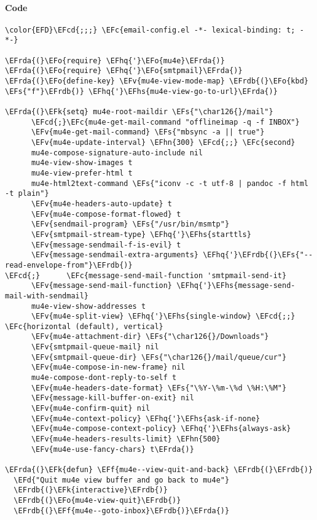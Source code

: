 \documentclass[a4wide,10pt]{article}
\newcommand{\EFc}[1]{\textcolor{EFc}{#1}} %
\newcommand{\EFcd}[1]{\textcolor{EFcd}{#1}} %
\newcommand{\EFs}[1]{\textcolor{EFs}{#1}} %
\newcommand{\EFd}[1]{\textcolor{EFd}{#1}} %
\newcommand{\EFk}[1]{\textcolor{EFk}{#1}} %
\newcommand{\EFf}[1]{\textcolor{EFf}{#1}} %
\newcommand{\EFv}[1]{\textcolor{EFv}{#1}} %
\newcommand{\EFo}[1]{\textcolor{EFo}{#1}} %
\newcommand{\EFhn}[1]{\textcolor{EFhn}{\textbf{#1}}} %
\newcommand{\EFhq}[1]{\textcolor{EFhq}{#1}} %
\newcommand{\EFhs}[1]{\textcolor{EFhs}{#1}} %
\newcommand{\EFrda}[1]{\textcolor{EFrda}{#1}} %
\newcommand{\EFrdb}[1]{\textcolor{EFrdb}{#1}} %
\begin{document}
\paragraph{Code}
\label{sec:orgbec5933}
\begin{Code}
\begin{Verbatim}
\color{EFD}\EFcd{;;;} \EFc{email-config.el -*- lexical-binding: t; -*-}

\EFrda{(}\EFo{require} \EFhq{'}\EFo{mu4e}\EFrda{)}
\EFrda{(}\EFo{require} \EFhq{'}\EFo{smtpmail}\EFrda{)}
\EFrda{(}\EFo{define-key} \EFv{mu4e-view-mode-map} \EFrdb{(}\EFo{kbd} \EFs{"f"}\EFrdb{)} \EFhq{'}\EFhs{mu4e-view-go-to-url}\EFrda{)}

\EFrda{(}\EFk{setq} mu4e-root-maildir \EFs{"\char126{}/mail"}
      \EFcd{;}\EFc{mu4e-get-mail-command "offlineimap -q -f INBOX"}
      \EFv{mu4e-get-mail-command} \EFs{"mbsync -a || true"}
      \EFv{mu4e-update-interval} \EFhn{300} \EFcd{;;} \EFc{second}
      mu4e-compose-signature-auto-include nil
      mu4e-view-show-images t
      mu4e-view-prefer-html t
      mu4e-html2text-command \EFs{"iconv -c -t utf-8 | pandoc -f html -t plain"}
      \EFv{mu4e-headers-auto-update} t
      \EFv{mu4e-compose-format-flowed} t
      \EFv{sendmail-program} \EFs{"/usr/bin/msmtp"}
      \EFv{smtpmail-stream-type} \EFhq{'}\EFhs{starttls}
      \EFv{message-sendmail-f-is-evil} t
      \EFv{message-sendmail-extra-arguments} \EFhq{'}\EFrdb{(}\EFs{"--read-envelope-from"}\EFrdb{)}
\EFcd{;}      \EFc{message-send-mail-function 'smtpmail-send-it}
      \EFv{message-send-mail-function} \EFhq{'}\EFhs{message-send-mail-with-sendmail}
      mu4e-view-show-addresses t
      \EFv{mu4e-split-view} \EFhq{'}\EFhs{single-window} \EFcd{;;} \EFc{horizontal (default), vertical}
      \EFv{mu4e-attachment-dir} \EFs{"\char126{}/Downloads"}
      \EFv{smtpmail-queue-mail} nil
      \EFv{smtpmail-queue-dir} \EFs{"\char126{}/mail/queue/cur"}
      \EFv{mu4e-compose-in-new-frame} nil
      mu4e-compose-dont-reply-to-self t
      \EFv{mu4e-headers-date-format} \EFs{"\%Y-\%m-\%d \%H:\%M"}
      \EFv{message-kill-buffer-on-exit} nil
      \EFv{mu4e-confirm-quit} nil
      \EFv{mu4e-context-policy} \EFhq{'}\EFhs{ask-if-none}
      \EFv{mu4e-compose-context-policy} \EFhq{'}\EFhs{always-ask}
      \EFv{mu4e-headers-results-limit} \EFhn{500}
      \EFv{mu4e-use-fancy-chars} t\EFrda{)}

\EFrda{(}\EFk{defun} \EFf{mu4e--view-quit-and-back} \EFrdb{(}\EFrdb{)}
  \EFd{"Quit mu4e view buffer and go back to mu4e"}
  \EFrdb{(}\EFk{interactive}\EFrdb{)}
  \EFrdb{(}\EFo{mu4e-view-quit}\EFrdb{)}
  \EFrdb{(}\EFf{mu4e--goto-inbox}\EFrdb{)}\EFrda{)}


\end{Verbatim}
\end{Code}
\end{document}
